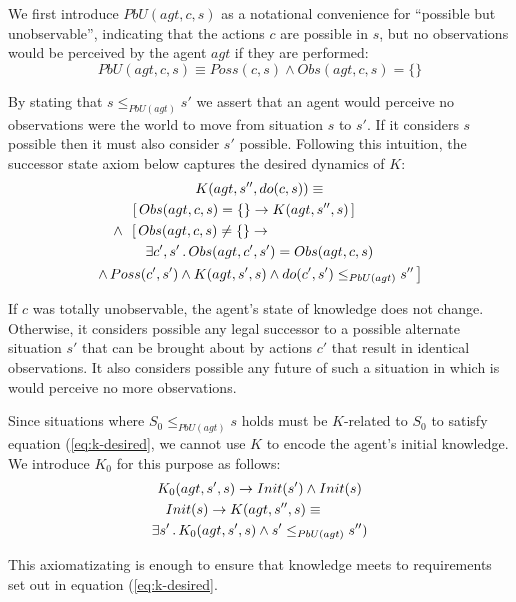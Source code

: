 \documentclass{ifaamas-submission}
\begin{document}
We first introduce $PbU(agt,c,s)$ as a notational convenience for {}``possible
but unobservable'',
indicating that the actions $c$ are possible in $s$, but no observations
would be perceived by the agent $agt$ if they are performed:
\begin{equation}
PbU(agt,c,s)\equiv
Poss(c,s)\wedge Obs(agt,c,s)=\{\}\label{eq:PbU_defn}
\end{equation}

By stating that $s\leq_{PbU(agt)}s'$ we assert that an agent would
perceive no observations were the world to move from situation $s$ to
$s'$. If it considers $s$ possible then it must also consider $s'$ possible.
 Following this intuition, the successor state axiom below
captures the desired dynamics of $K$:
\begin{multline}
K(agt,s'',do(c,s))\equiv\\
\shoveleft{\,\,\,\,\,\,\,\,\,\,\left[\, Obs(agt,c,s)=\{\}\rightarrow K(agt,s'',s)\,\right]}\\
\shoveleft{\,\,\wedge\,\,\,\left[\, Obs(agt,c,s)\neq\{\}\rightarrow\right.}\\
\exists c',s'\,.\, Obs(agt,c',s')=Obs(agt,c,s)\\
\left.\wedge\, Poss(c',s')\wedge K(agt,s',s)\wedge do(c',s')\leq_{PbU(agt)}s''\,\right]\label{eqn:new_k_ssa}
\end{multline}

If $c$ was totally unobservable, the agent's state of knowledge does
not change. Otherwise, it considers possible any legal successor to
a possible alternate situation $s'$ that can be brought about by
actions $c'$ that result in identical observations. It also considers
possible any future of such a situation in which is would perceive no
more observations.

Since situations
where $S_{0}\leq_{PbU(agt)}s$ holds must be $K$-related to $S_{0}$ to
satisfy equation (\ref{eq:k-desired}, we
cannot use $K$ to encode the agent's initial knowledge.
We introduce $K_{0}$ for this purpose as follows:
\begin{multline}
K_{0}(agt,s',s)\rightarrow Init(s')\wedge Init(s)\\
\shoveleft{Init(s)\rightarrow K(agt,s'',s)\equiv}\\
\exists s'\,.\, K_{0}(agt,s',s)\wedge s'\leq_{PbU(agt)}s'')\label{eqn:new_k_s0}\end{multline}

This axiomatizating is enough to ensure that knowledge meets to requirements
set out in equation (\ref{eq:k-desired}.
\end{document}
